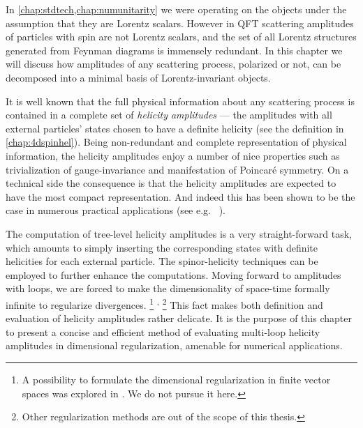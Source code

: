\newcommand\helampl{\mathcal{A}_{\vb*{\lambda}}}

In \cref{chap:stdtech,chap:numunitarity} we were operating on the objects under the assumption that they are Lorentz scalars.
However in QFT scattering amplitudes of particles with spin are not Lorentz scalars,
and the set of all Lorentz structures generated from Feynman diagrams is immensely redundant.
In this chapter we will discuss how amplitudes of any scattering process, 
polarized or not, can be decomposed into a minimal basis of Lorentz-invariant objects.

It is well known that the full physical information about any scattering process is contained in a complete set of \textit{helicity amplitudes} ---
the amplitudes with all external particles' states chosen to have a definite helicity (see the definition in \cref{chap:4dspinhel}).
Being non-redundant and complete representation of physical information, the helicity amplitudes 
enjoy a number of nice properties such as trivialization of gauge-invariance and manifestation of Poincaré symmetry.
On a technical side the consequence is that the helicity amplitudes are expected to have the most compact representation.
And indeed this has been shown to be the case in numerous practical applications (see e.g.\ %
\cite{DeLaurentis:2019phz,Badger:2019djh,Badger:2011yu,Badger:2013gxa,DeFreitas:2004kmi,Gehrmann:2011aa,Gehrmann:2009vu,Glover:2004si,Glover:2003cm,Garland:2002ak,Dunbar:2016aux,Dunbar:2016gjb,Dunbar:2016cxp,Badger:2015lda,Gehrmann:2015bfy,Bern:2003ck,Bern:2002tk,Badger:2018enw,Dunbar2017,Kunszt:1994nq}).

The computation of tree-level helicity amplitudes is a very straight-forward task,
which amounts to simply inserting the corresponding states with definite helicities for each external particle.
The spinor-helicity techniques can be employed to further enhance the computations.
Moving forward to amplitudes with loops,
we are forced to make the dimensionality of space-time formally infinite \cite{Collins:1984xc} 
to regularize divergences.%
\footnote{
  A possibility to formulate the dimensional regularization in finite vector spaces was explored in \cite{Weinzierl:1999xb}.
  We do not pursue it here.
}%
\textsuperscript{,}%
\footnote{
  Other regularization methods are out of the scope of this thesis.
}
This fact makes both definition and evaluation of helicity amplitudes rather delicate.
It is the purpose of this chapter to present a concise and efficient method of
evaluating multi-loop helicity amplitudes in dimensional regularization,
amenable for numerical applications.

